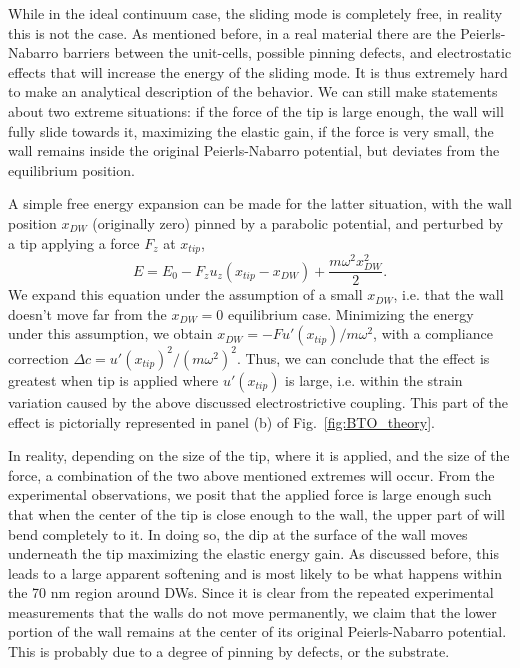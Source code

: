 While in the ideal continuum case, the sliding mode is completely free, in reality this is not the case.
As mentioned before, in a real material there are the Peierls-Nabarro barriers between the unit-cells, possible pinning defects, and electrostatic effects that will increase the energy of the sliding mode.
It is thus extremely hard to make an analytical description of the behavior.
We can still make statements about two extreme situations: if the force of the tip is large enough, the wall will fully slide towards it, maximizing the elastic gain, if the force is very small, the wall remains inside the original Peierls-Nabarro potential, but deviates from the equilibrium position.

A simple free energy expansion can be made for the latter situation, with the wall position $x_{DW}$ (originally zero) pinned by a parabolic potential, and perturbed by a tip applying a force $F_z$ at $x_{tip}$,
\begin{equation}
	E = E_0 - F_z u_z (x_{tip} - x_{DW}) + \frac{m\omega^2 x_{DW}^2}{2}.
\end{equation}
We expand this equation under the assumption of a small $x_{DW}$, i.e. that the wall doesn't move far from the $x_{DW}=0$ equilibrium case.
Minimizing the energy under this assumption, we obtain $x_{DW} = -F u'(x_{tip})/m \omega^2$, with a compliance correction $\Delta c = u'(x_{tip})^2/(m\omega^2)^2$.
Thus, we can conclude that the effect is greatest when tip is applied where $u'(x_{tip})$ is large, i.e. within the strain variation caused by the above discussed electrostrictive coupling.
This part of the effect is pictorially represented in panel (b) of Fig.~\ref{fig:BTO_theory}.


In reality, depending on the size of the tip, where it is applied, and the size of the force, a combination of the two above mentioned extremes will occur.
From the experimental observations, we posit that the applied force is large enough such that when the center of the tip is close enough to the wall, the upper part of will bend completely to it.
In doing so, the dip at the surface of the wall moves underneath the tip maximizing the elastic energy gain.
As discussed before, this leads to a large apparent softening and is most likely to be what happens within the 70 nm region around DWs.
Since it is clear from the repeated experimental measurements that the walls do not move permanently, we claim that the lower portion of the wall remains at the center of its original Peierls-Nabarro potential.
This is probably due to a degree of pinning by defects, or the substrate.


